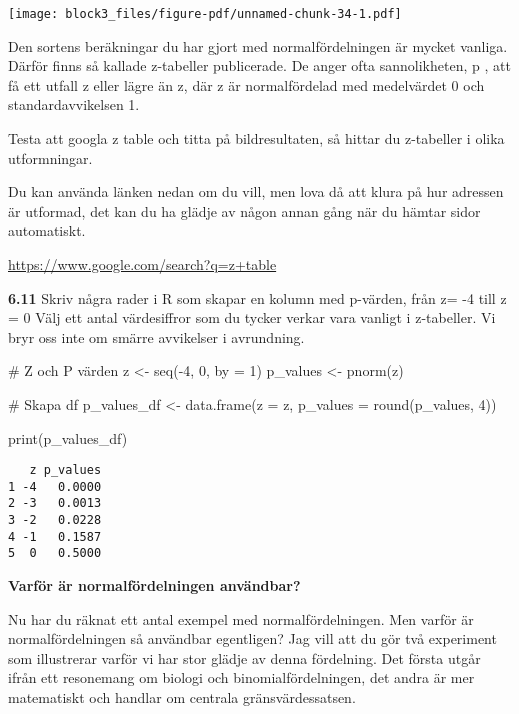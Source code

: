 \documentclass[
  letterpaper,
  DIV=11,
  numbers=noendperiod]{scrartcl}
\newenvironment{Shaded}{\begin{snugshade}}{\end{snugshade}}
\newcommand{\AttributeTok}[1]{\textcolor[rgb]{0.40,0.45,0.13}{#1}}
\newcommand{\CommentTok}[1]{\textcolor[rgb]{0.37,0.37,0.37}{#1}}
\newcommand{\DecValTok}[1]{\textcolor[rgb]{0.68,0.00,0.00}{#1}}
\newcommand{\FunctionTok}[1]{\textcolor[rgb]{0.28,0.35,0.67}{#1}}
\newcommand{\NormalTok}[1]{\textcolor[rgb]{0.00,0.23,0.31}{#1}}
\newcommand{\OtherTok}[1]{\textcolor[rgb]{0.00,0.23,0.31}{#1}}
\newcommand{\SpecialCharTok}[1]{\textcolor[rgb]{0.37,0.37,0.37}{#1}}
\begin{document}
\texttt{[image: block3\_files/figure-pdf/unnamed-chunk-34-1.pdf]}

Den sortens beräkningar du har gjort med normalfördelningen är mycket
vanliga. Därför finns så kallade z-tabeller publicerade. De anger ofta
sannolikheten, p , att få ett utfall z eller lägre än z, där z är
normalfördelad med medelvärdet 0 och standardavvikelsen 1.

Testa att googla z table och titta på bildresultaten, så hittar du
z-tabeller i olika utformningar.

Du kan använda länken nedan om du vill, men lova då att klura på hur
adressen är utformad, det kan du ha glädje av någon annan gång när du
hämtar sidor automatiskt.

\url{https://www.google.com/search?q=z+table}

\textbf{6.11} Skriv några rader i R som skapar en kolumn med p-värden,
från z= -4 till z = 0 Välj ett antal värdesiffror som du tycker verkar
vara vanligt i z-tabeller. Vi bryr oss inte om smärre avvikelser i
avrundning.

\begin{Shaded}
\begin{Highlighting}[]
\CommentTok{\# Z och P värden}
\NormalTok{z }\OtherTok{\textless{}{-}} \FunctionTok{seq}\NormalTok{(}\SpecialCharTok{{-}}\DecValTok{4}\NormalTok{, }\DecValTok{0}\NormalTok{, }\AttributeTok{by =} \DecValTok{1}\NormalTok{)}
\NormalTok{p\_values }\OtherTok{\textless{}{-}} \FunctionTok{pnorm}\NormalTok{(z)}

\CommentTok{\# Skapa df}
\NormalTok{p\_values\_df }\OtherTok{\textless{}{-}} \FunctionTok{data.frame}\NormalTok{(}\AttributeTok{z =}\NormalTok{ z, }\AttributeTok{p\_values =} \FunctionTok{round}\NormalTok{(p\_values, }\DecValTok{4}\NormalTok{))}

\FunctionTok{print}\NormalTok{(p\_values\_df)}
\end{Highlighting}
\end{Shaded}

\begin{verbatim}
   z p_values
1 -4   0.0000
2 -3   0.0013
3 -2   0.0228
4 -1   0.1587
5  0   0.5000
\end{verbatim}

\textbf{Varför är normalfördelningen användbar?}

Nu har du räknat ett antal exempel med normalfördelningen. Men varför är
normalfördelningen så användbar egentligen? Jag vill att du gör två
experiment som illustrerar varför vi har stor glädje av denna
fördelning. Det första utgår ifrån ett resonemang om biologi och
binomialfördelningen, det andra är mer matematiskt och handlar om
centrala gränsvärdessatsen.
\end{document}
